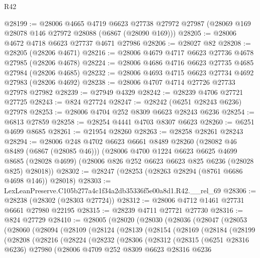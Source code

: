 \begin{lexlean}{R42}
\begin{coremodule}
{@28199 := @28006
    @4665
    @4719
    @6623
    @27738
    @27972
    @27987
    (@28069 @169 @28078 @146 @27972 @28088 (@6867 (@28090 @169)))
@28205 := @28006 @4672 @4718 @6623 @27737 @4671 @27986
@28206 := @28027 @82
@28208 := @28205 (@28206 @4671)
@28216 := @28006 @4679 @4717 @6623 @27736 @4678 @27985 (@28206 @4678)
@28224 := @28006 @4686 @4716 @6623 @27735 @4685 @27984 (@28206 @4685)
@28232 := @28006 @4693 @4715 @6623 @27734 @4692 @27983 (@28206 @4692)
@28238 := @28006 @4707 @4714 @27726 @27733 @27978 @27982
@28239 := @27949 @4329
@28242 := @28239 @4706 @27721 @27725
@28243 := @824 @27724
@28247 := @28242 (@6251 @28243 @6236) @27978
@28253 := @28006 @4704 @252 @8309 @6623 @28243 @6236
@28254 := @6813 @27859
@28258 := @28254 @4441 @4703 @8307 @6623
@28260 := @6251 @4699 @8685
@28261 := @21954 @28260
@28263 := @28258 @28261 @28243
@28294 := @28006
    @248
    @4702
    @6623
    @6661
    @8489
    @28260
    (@28082 @46 @8489 (@6867 (@28085 @46)))
    (@28006
      @4700
      @1224
      @6623
      @6625
      @4699
      @8685
      (@28028 @4699)
      (@28006 @826 @252 @6623 @6623 @825 @6236 (@28028 @825) @28018))
@28302 := @28247 (@28253 (@28263 @28294 (@8761 @6686 @4698 @146)) @28018)
@28303 := LexLeanPreserve.C105b277a4c1f34a2db35336f5e00a8d1.R42.__rel_69
@28306 := @28238 (@28302 (@28303 @27724))
@28312 := @28006 @4712 @1461 @27731 @6661 @27980 @22195
@28315 := @28239 @4711 @27721 @27730
@28316 := @824 @27729
@28410 := @28005
    (@28020
      (@28030
        (@28036
          (@28047
            (@28053
              (@28060
                (@28094
                  (@28109
                    (@28124
                      (@28139
                        (@28154
                          (@28169
                            (@28184
                              (@28199
                                (@28208
                                  (@28216
                                    (@28224
                                      (@28232
                                        (@28306
                                          (@28312
                                            (@28315
                                              (@6251 @28316 @6236)
                                              @27980
                                              (@28006
                                                @4709
                                                @252
                                                @8309
                                                @6623
                                                @28316
                                                @6236
}
\end{coremodule}
\end{lexlean}
